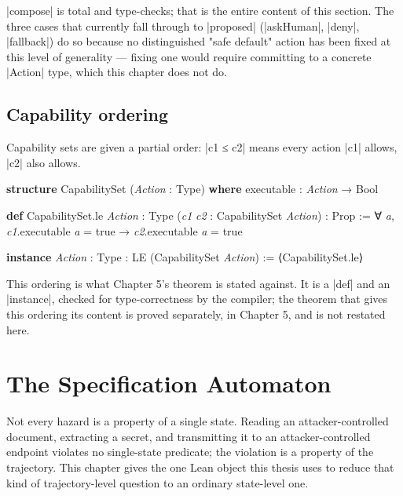 \documentclass{memoir}
\begin{document}
\LeanVerb|compose| is total and type-checks; that is the entire content of this
section. The three cases that currently fall through to \LeanVerb|proposed|
(\LeanVerb|askHuman|, \LeanVerb|deny|, \LeanVerb|fallback|) do so because no distinguished "safe
default" action has been fixed at this level of generality — fixing one
would require committing to a concrete \LeanVerb|Action| type, which this chapter
does not do.



\section{Capability ordering}\label{Capability--Monotonicity--in--a--Formal--Skeleton--for--Agentic--AI--Safety----The--Formal--Model----Capability--ordering}

Capability sets are given a partial order: \LeanVerb|c1 ≤ c2| means every action
\LeanVerb|c1| allows, \LeanVerb|c2| also allows.

\begin{LeanVerbatim}
\textbf{structure} CapabilitySet (\textit{Action} : Type) \textbf{where}
  executable : \textit{Action} → Bool

\textbf{def} CapabilitySet.le \textit{Action} : Type (\textit{c1} \textit{c2} : CapabilitySet \textit{Action}) : Prop :=
  ∀ \textit{a}, \textit{c1}.executable \textit{a} = true → \textit{c2}.executable \textit{a} = true

\textbf{instance} \textit{Action} : Type : LE (CapabilitySet \textit{Action}) := ⟨CapabilitySet.le⟩

\end{LeanVerbatim}


This ordering is what Chapter 5's theorem is stated against. It is a
\LeanVerb|def| and an \LeanVerb|instance|, checked for type-correctness by the compiler; the
theorem that gives this ordering its content is proved separately, in
Chapter 5, and is not restated here.





\chapter{The Specification Automaton}\label{Capability--Monotonicity--in--a--Formal--Skeleton--for--Agentic--AI--Safety----The--Specification--Automaton}

Not every hazard is a property of a single state. Reading an
attacker-controlled document, extracting a secret, and transmitting it to
an attacker-controlled endpoint violates no single-state predicate; the
violation is a property of the trajectory. This chapter gives the one Lean
object this thesis uses to reduce that kind of trajectory-level question to
an ordinary state-level one.
\end{document}

